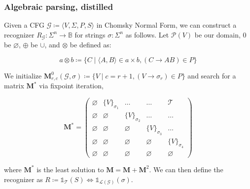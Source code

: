 \documentclass{beamer}
\begin{document}
    \begin{frame}
        \frametitle{Algebraic parsing, distilled}
        Given a CFG $\mathcal{G} \coloneqq \langle V, \Sigma, P, S\rangle$ in Chomsky Normal Form, we can construct a recognizer $R_\mathcal{G}: \Sigma^n \rightarrow \mathbb{B}$ for strings $\sigma: \Sigma^n$ as follows. Let $\mathcal P(V)$ be our domain, $0$ be $\varnothing$, $\oplus$ be $\cup$, and $\otimes$ be defined as:

        \vspace{-7pt}
        \[
            a \otimes b \coloneqq \{C \mid \langle A, B\rangle \in a \times b, (C\rightarrow AB) \in P\}
        \]

        \noindent We initialize $\mathbf{M}^0_{r,c}(\mathcal{G}, \sigma) \coloneqq \{V \mid c = r + 1, (V \rightarrow \sigma_r) \in P\}$ and search for a matrix $\mathbf{M}^*$ via fixpoint iteration,

        \vspace{-5}
        \[
            \mathbf{M}^* = \begin{pmatrix}
                               \varnothing & \{V\}_{\sigma_1} & \ldots & \ldots & \mathcal{T} \\
                               \varnothing & \varnothing & \{V\}_{\sigma_2} & \ldots & \ldots \\
                               \varnothing & \varnothing & \varnothing & \{V\}_{\sigma_3} & \ldots \\
                               \varnothing & \varnothing & \varnothing & \varnothing & \{V\}_{\sigma_4} \\
                               \varnothing & \varnothing & \varnothing & \varnothing & \varnothing
            \end{pmatrix}
        \]

        \noindent where $\mathbf{M}^*$ is the least solution to $\mathbf{M} = \mathbf{M} + \mathbf{M}^2$. We can then define the recognizer as $R \coloneqq \mathds{1}_{\mathcal{T}}(S) \iff \mathds{1}_{\mathcal{L}(\mathcal{G})}(\sigma)$.
    \end{frame}
\end{document}
